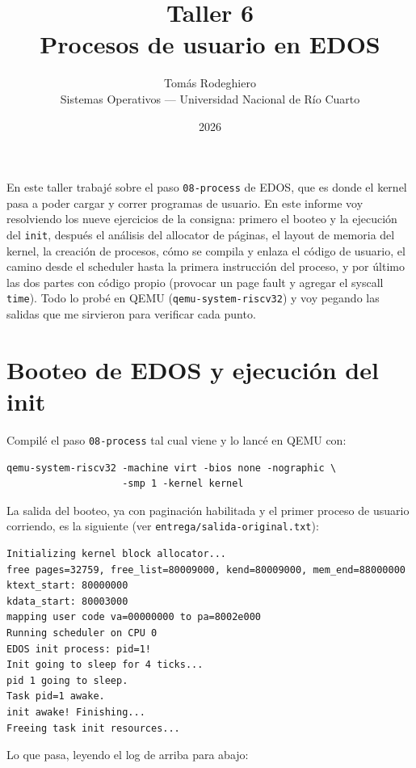 \documentclass[11pt,a4paper]{article}
\title{
    \vspace{-2.5em}
    \textbf{Taller 6} \\[0.3em]
    \large Procesos de usuario en EDOS
}
\author{
    Tomás Rodeghiero \\
    \small Sistemas Operativos --- Universidad Nacional de Río Cuarto
}
\date{2026}
\begin{document}
\maketitle

En este taller trabajé sobre el paso \texttt{08-process} de EDOS, que es donde el
kernel pasa a poder cargar y correr programas de usuario. En este informe voy
resolviendo los nueve ejercicios de la consigna: primero el booteo y la
ejecución del \texttt{init}, después el análisis del allocator de páginas, el
layout de memoria del kernel, la creación de procesos, cómo se compila y enlaza
el código de usuario, el camino desde el scheduler hasta la primera instrucción
del proceso, y por último las dos partes con código propio (provocar un page
fault y agregar el syscall \texttt{time}). Todo lo probé en QEMU
(\texttt{qemu-system-riscv32}) y voy pegando las salidas que me sirvieron para
verificar cada punto.

\tableofcontents
\bigskip

\section{Booteo de EDOS y ejecución del init}

Compilé el paso \texttt{08-process} tal cual viene y lo lancé en QEMU con:

\begin{lstlisting}[style=shellstyle]
qemu-system-riscv32 -machine virt -bios none -nographic \
                    -smp 1 -kernel kernel
\end{lstlisting}

La salida del booteo, ya con paginación habilitada y el primer proceso de
usuario corriendo, es la siguiente (ver \texttt{entrega/salida-original.txt}):

\begin{lstlisting}[style=textstyle]
Initializing kernel block allocator...
free pages=32759, free_list=80009000, kend=80009000, mem_end=88000000
ktext_start: 80000000
kdata_start: 80003000
mapping user code va=00000000 to pa=8002e000
Running scheduler on CPU 0
EDOS init process: pid=1!
Init going to sleep for 4 ticks...
pid 1 going to sleep.
Task pid=1 awake.
init awake! Finishing...
Freeing task init resources...
\end{lstlisting}

Lo que pasa, leyendo el log de arriba para abajo:
\end{document}
